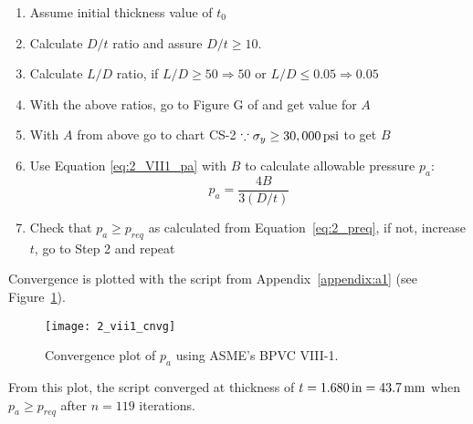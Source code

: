 \begin{enumerate}
	\item Assume initial thickness value of $t_0$
	\item Calculate $D/t$ ratio and assure $D/t \geq 10$.
	\item Calculate $L/D$ ratio, if $L/D \geq 50 \Rightarrow 50$ or  $L/D \leq 0.05 \Rightarrow 0.05$
	\item With the above ratios, go to Figure G of \cite{ASMEbvpcIID} and get value for $A$
	\item With $A$ from above go to chart CS-2 $\because \sigma_y \geq 30,000 \,\mathrm{psi}$ to get $B$
	\item Use Equation \ref{eq:2_VII1_pa} with $B$ to calculate allowable pressure $p_a$:
	      \begin{equation}
	      	\label{eq:2_VII1_pa}
	      	p_a = \frac{4B}{3 \left(D/t\right)}
	      \end{equation}
	\item Check that $p_a \geq p_{req}$ as calculated from Equation~\ref{eq:2_preq}, if not, increase $t$, go to Step 2 and repeat\\
	      	
\end{enumerate}

Convergence is plotted with the script from Appendix~\ref{appendix:a1} (see Figure~\ref{fig:2_vii1_cnvg}).
\begin{figure}[H]
	\centering
	\texttt{[image: 2\_vii1\_cnvg]}
	\caption{Convergence plot of $p_a$ using ASME's BPVC VIII-1.}
	\label{fig:2_vii1_cnvg}
\end{figure}

From this plot, the script converged at thickness of $t = 1.680\,\mathrm{in} = 43.7\,\mathrm{mm}$ when $p_a\geq p_{req}$ after $n=119$ iterations. 


